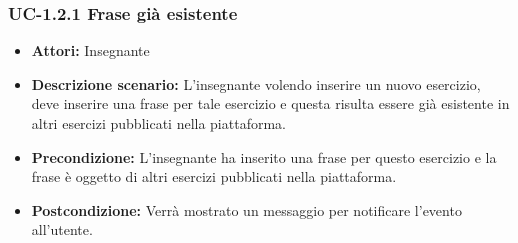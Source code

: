 \subsubsection{UC-1.2.1 Frase già esistente}
\begin{itemize}
\item \textbf{Attori: }Insegnante
\item \textbf{Descrizione scenario: }L'insegnante volendo inserire un nuovo esercizio, deve inserire una frase per tale esercizio e questa risulta essere già esistente in altri esercizi pubblicati nella piattaforma.
\item \textbf{Precondizione: }L'insegnante ha inserito una frase per questo esercizio e la frase è oggetto di altri esercizi pubblicati nella piattaforma.
\item \textbf{Postcondizione: }Verrà mostrato un messaggio per notificare l'evento all'utente.
\end{itemize}
